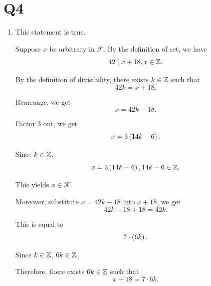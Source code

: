 \section{Q4}
\begin{enumerate}[label = (\alph*)]
    \item \begin{solution}
        This statement is true. 

        Suppose $x$ be arbitrary in $\mathcal{F}$. By the definition of set, we have 
        \begin{equation*}
            42 \mid x + 18, x \in \mathbb{Z}. 
        \end{equation*} 

        By the definition of divisibility, there exists $k \in \mathbb{Z}$ such that 
        \begin{equation*}
            42k = x + 18. 
        \end{equation*}

        Rearrange, we get 
        \begin{equation*}
            x = 42k - 18. 
        \end{equation*}

        Factor 3 out, we get 
        \begin{equation*}
            x = 3\left(14k - 6\right).
        \end{equation*}

        Since $k \in \mathbb{Z}$, 
        \begin{equation*}
            x = 3\left(14k - 6\right), 14k - 6 \in \mathbb{Z}. 
        \end{equation*}

        This yields $x \in \mathcal{K}$. 

        Moreover, substitute $x = 42k - 18$ into $x + 18$, we get 
        \begin{equation*}
            42k - 18 + 18 = 42k. 
        \end{equation*}

        This is equal to 
        \begin{equation*}
            7 \cdot \left(6k\right). 
        \end{equation*}

        Since $k \in \mathbb{Z}$, $6k \in \mathbb{Z}$. 

        Therefore, there exists $6k \in \mathbb{Z}$ such that 
        \begin{equation*}
            x + 18 = 7 \cdot 6k. 
        \end{equation*}


\end{solution}
\end{enumerate}
